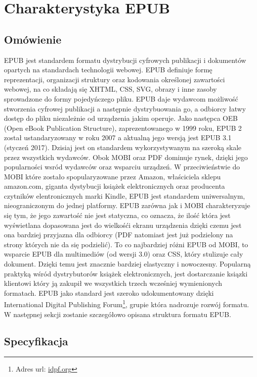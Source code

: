 \chapter{Charakterystyka EPUB}

\section{Omówienie}

EPUB jest standardem formatu dystrybucji cyfrowych publikacji i dokumentów opartych na standardach technologii webowej. EPUB definiuje formę reprezentacji, organizacji struktury oraz kodowania określonej zawartości webowej, na co składają się XHTML, CSS, SVG, obrazy i inne zasoby sprowadzone do formy pojedyńczego pliku. EPUB daje wydawcom możliwość stworzenia cyfrowej publikacji a następnie dystrybuowania go, a odbiorcy łatwy dostęp do pliku niezależnie od urządzenia jakim operuje. Jako następca OEB (Open eBook Publication Structure), zaprezentowanego w 1999 roku, EPUB 2 został ustandaryzowany w roku 2007 a aktualną jego wersją jest EPUB 3.1 (styczeń 2017). Dzisiaj jest on standardem wykorzystywanym na szeroką skale przez wszystkich wydawców. Obok MOBI oraz PDF dominuje rynek, dzięki jego popularności wsród wydawców oraz wsparciu urządzeń. W przeciwieństwie do MOBI które zostało spopularyzowane przez Amazon, właściciela sklepu amazon.com, giganta dystybucji książek elektronicznych oraz producenta czytników elentronicznych marki Kindle, EPUB jest standardem uniwersalnym, nieograniczonym do jednej platformy. EPUB zarówna jak i MOBI charakteryzuje się tym, że jego zawartość nie jest statyczna, co oznacza, że ilość która jest wyświetlana dopasowana jest do wielkośći ekranu urządzenia dzięki czemu jest ona bardziej przyjazna dla odbiorcy (PDF natomiast jest już podzielony na strony których nie da się podzielić). To co najbardziej różni EPUB od MOBI, to wsparcie EPUB dla multimediów (od wersji 3.0) oraz CSS, który stulizuje cały dokument. Dzięki temu jest znacznie bardziej elastyczny i nowoczesny. Popularną praktyką wśród dystrybutorów książek elektronicznych, jest dostarczanie ksiązki klientowi który ją zakupił we wszystkich trzech wcześniej wymienionych formatach. EPUB jako standard jest szeroko udokumentowany dzięki International Digital Publishing Forum\footnote{Adres url: \href{idpf.org}{idpf.org}}, grupie która nadrozuje rozwój formatu. W następnej sekcji zostanie szczegółowo opisana struktura formatu EPUB.

\section{Specyfikacja}

